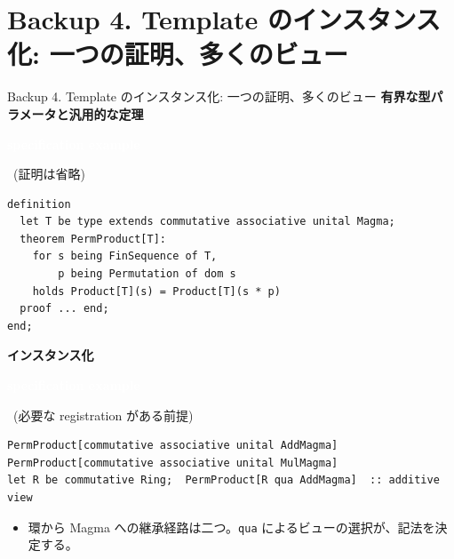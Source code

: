 \documentclass[dvipdfmx,aspectratio=169,11pt]{beamer}
\newcommand{\statusbadge}[2]{\colorbox{#1}{\textcolor{white}{\strut\scriptsize\sffamily\bfseries #2}}}
\newcommand{\badgeSpec}{\statusbadge{green!35!black}{specification example}}
\begin{document}
\section{Backup 4. Template のインスタンス化: 一つの証明、多くのビュー}
\begin{frame}[fragile,t]{Backup 4. Template のインスタンス化: 一つの証明、多くのビュー}
\smallskip
\textbf{有界な型パラメータと汎用的な定理}~\badgeSpec~{\footnotesize(証明は省略)}
\begin{lstlisting}[language={mizar},basicstyle=\ttfamily\footnotesize]
definition
  let T be type extends commutative associative unital Magma;
  theorem PermProduct[T]:
    for s being FinSequence of T,
        p being Permutation of dom s
    holds Product[T](s) = Product[T](s * p)
  proof ... end;
end;
\end{lstlisting}
\smallskip
\textbf{インスタンス化}~\badgeSpec~{\footnotesize(必要な registration がある前提)}
\begin{lstlisting}[language={mizar},basicstyle=\ttfamily\small]
PermProduct[commutative associative unital AddMagma]
PermProduct[commutative associative unital MulMagma]
let R be commutative Ring;  PermProduct[R qua AddMagma]  :: additive view
\end{lstlisting}
\begin{itemize}
\setlength{\itemsep}{1pt}
\setlength{\parsep}{0pt}
\setlength{\parskip}{0pt}
\item 環から Magma への継承経路は二つ。\texttt{qua} によるビューの選択が、記法を決定する。
\end{itemize}
\end{frame}
\end{document}
